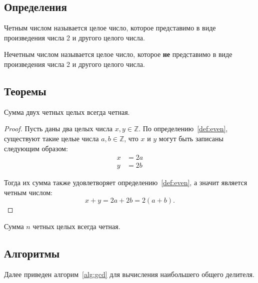 \subsection{Определения}\label{sec:definitions}

\begin{definition}\label{def:even} Четным числом называется целое число, которое представимо
в виде произведения числа 2 и другого целого числа.
\end{definition}

\begin{definition}\label{def:odd} Нечетным числом называется целое
число, которое \textbf{не} представимо в виде произведения числа 2 и
другого целого числа.
\end{definition}

\subsection{Теоремы}\label{sec:theorems}

\begin{theorem}\label{thm:even} Сумма двух четных целых всегда четная.
\end{theorem}

\begin{proof} Пусть даны два целых числа $x, y \in \mathbb{Z}$. По определению\ \ref{def:even},
существуют такие целые числа $a, b \in \mathbb{Z}$, что $x$ и $y$ могут быть записаны следующим образом:
$$
\begin{aligned}
x &= 2a \\
y &= 2b
\end{aligned}
$$

Тогда их сумма также удовлетворяет определению\ \ref{def:even},
а значит является четным числом:
$$
x + y = 2a + 2b = 2(a + b).
$$
\end{proof}

\begin{corollary}\label{cor:even} Сумма $n$ четных целых всегда четная.
\end{corollary}

\subsection{Алгоритмы}\label{sec:algorithms}

Далее приведен алгорим~\ref{alg:gcd} для вычисления наибольшего общего
делителя.

